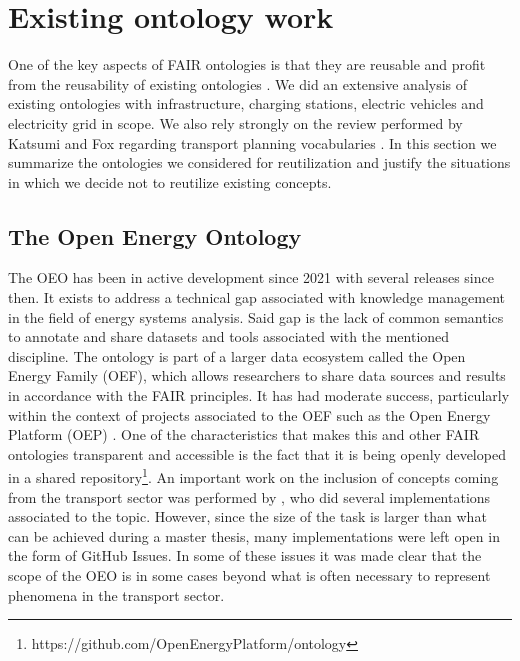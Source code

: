 
\section{Existing ontology work}
\label{existingontologies}

One of the key aspects of FAIR ontologies is that they are reusable and profit
from the reusability of existing ontologies \cite{PovedaVillalon.2020}. We did
an extensive analysis of existing ontologies with infrastructure, charging
stations, electric vehicles and electricity grid in scope. We also rely
strongly on the review performed by Katsumi and Fox regarding transport
planning vocabularies \cite{Katsumi.2018}. In this section we summarize the
ontologies we considered for reutilization and justify the situations in which
we decide not to reutilize existing concepts.


\subsection{The Open Energy Ontology}

The OEO has been in active development since 2021 with several releases since
then. It exists to address a technical gap associated with knowledge management
in the field of energy systems analysis. Said gap is the lack of common
semantics to annotate and share datasets and tools associated with the
mentioned discipline. The ontology is part of a larger data ecosystem called
the Open Energy Family (OEF), which allows researchers to share data sources
and results in accordance with the FAIR principles. It has had moderate
success, particularly within the context of projects associated to the OEF such
as the Open Energy Platform (OEP) \cite{Hulk.2024}. One of the characteristics
that makes this and other FAIR ontologies transparent and accessible is the
fact that it is being openly developed in a shared
repository\footnote{https://github.com/OpenEnergyPlatform/ontology}. An
important work on the inclusion of concepts coming from the transport sector
was performed by \cite{Mittermeier.2023}, who did several implementations
associated to the topic. However, since the size of the task is larger than what
can be achieved during a master thesis, many implementations were left open in
the form of GitHub Issues. In some of these issues it was made clear that the
scope of the OEO is in some cases beyond what is often necessary to represent
phenomena in the transport sector.


